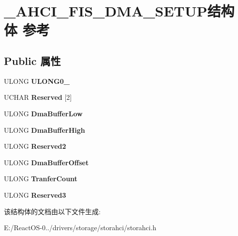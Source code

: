 \hypertarget{struct___a_h_c_i___f_i_s___d_m_a___s_e_t_u_p}{}\section{\+\_\+\+A\+H\+C\+I\+\_\+\+F\+I\+S\+\_\+\+D\+M\+A\+\_\+\+S\+E\+T\+U\+P结构体 参考}
\label{struct___a_h_c_i___f_i_s___d_m_a___s_e_t_u_p}
\subsection*{Public 属性}
\begin{DoxyCompactItemize}
\item 
\mbox{\label{struct___a_h_c_i___f_i_s___d_m_a___s_e_t_u_p_a06113f056240bacbde79a441a41d8be7}} 
U\+L\+O\+NG {\bfseries U\+L\+O\+N\+G0\+\_}
\item 
\mbox{\label{struct___a_h_c_i___f_i_s___d_m_a___s_e_t_u_p_a72b71174af83c8c7ebc10285963b3c43}} 
U\+C\+H\+AR {\bfseries Reserved} \mbox{[}2\mbox{]}
\item 
\mbox{\label{struct___a_h_c_i___f_i_s___d_m_a___s_e_t_u_p_a8061bd3abd9ef1f9400c95006df4619e}} 
U\+L\+O\+NG {\bfseries Dma\+Buffer\+Low}
\item 
\mbox{\label{struct___a_h_c_i___f_i_s___d_m_a___s_e_t_u_p_a51b3c77c1c0113c5aaa69be109f7b2fa}} 
U\+L\+O\+NG {\bfseries Dma\+Buffer\+High}
\item 
\mbox{\label{struct___a_h_c_i___f_i_s___d_m_a___s_e_t_u_p_a7a3bf79d716cc92c5b09490b53ca1677}} 
U\+L\+O\+NG {\bfseries Reserved2}
\item 
\mbox{\label{struct___a_h_c_i___f_i_s___d_m_a___s_e_t_u_p_afbcf26a92332ae893024f10da7c18075}} 
U\+L\+O\+NG {\bfseries Dma\+Buffer\+Offset}
\item 
\mbox{\label{struct___a_h_c_i___f_i_s___d_m_a___s_e_t_u_p_aa1e3dd73fa131cfd3a4cc2365bd31177}} 
U\+L\+O\+NG {\bfseries Tranfer\+Count}
\item 
\mbox{\label{struct___a_h_c_i___f_i_s___d_m_a___s_e_t_u_p_a70151b90f65b90c069804f71471750e9}} 
U\+L\+O\+NG {\bfseries Reserved3}
\end{DoxyCompactItemize}


该结构体的文档由以下文件生成\+:\begin{DoxyCompactItemize}
\item 
E\+:/\+React\+O\+S-\/0../drivers/storage/storahci/storahci.\+h\end{DoxyCompactItemize}
